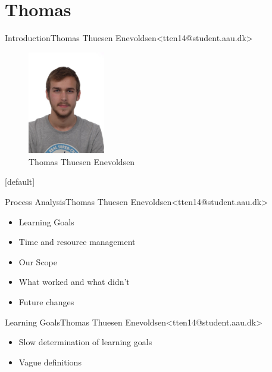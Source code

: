 \section{Thomas}


\begin{frame}{Introduction}{Thomas Thuesen Enevoldsen\newline<tten14@student.aau.dk>}
	\begin{figure}[h!]
    	\includegraphics[width=0.3\textwidth]{images/thomas.jpg}
    	\caption{Thomas Thuesen Enevoldsen}
		\centering    		
	\end{figure}
\end{frame}

[default]

\begin{frame}{Process Analysis}{Thomas Thuesen Enevoldsen\newline<tten14@student.aau.dk>}
  \begin{itemize}
  	\item Learning Goals
  	\item Time and resource management
  	\item Our Scope
  	\item What worked and what didn't
  	\item Future changes
  \end{itemize}
\end{frame}

\begin{frame}{Learning Goals}{Thomas Thuesen Enevoldsen\newline<tten14@student.aau.dk>}
    \begin{itemize}
  	\item Slow determination of learning goals 
  	\item Vague definitions 
  \end{itemize}
\end{frame}

